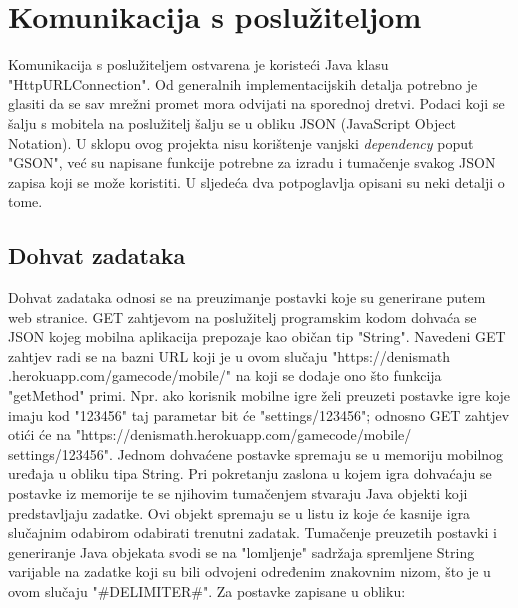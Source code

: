 \documentclass[times, utf8, zavrsni, numeric]{fer}
\begin{document}
	
	\section{Komunikacija s poslužiteljom}
	Komunikacija s poslužiteljem ostvarena je koristeći Java klasu "HttpURLConnection". Od generalnih implementacijskih detalja potrebno je glasiti da se sav mrežni promet mora odvijati na sporednoj dretvi. 
	Podaci koji se šalju s mobitela na poslužitelj šalju se u obliku JSON (JavaScript Object Notation). U sklopu ovog projekta nisu korištenje vanjski \textit{dependency} poput "GSON", već
	su napisane funkcije potrebne za izradu i tumačenje svakog JSON zapisa koji se može koristiti. U sljedeća dva potpoglavlja opisani su neki detalji o tome.
	\subsection{Dohvat zadataka}
	Dohvat zadataka odnosi se na preuzimanje postavki koje su generirane putem web stranice. GET zahtjevom na poslužitelj programskim kodom dohvaća se JSON kojeg mobilna aplikacija prepozaje kao običan tip "String".
	Navedeni GET zahtjev radi se na bazni URL koji je u ovom slučaju "https://denismath .herokuapp.com/gamecode/mobile/" na koji se dodaje ono što funkcija "getMethod" primi. Npr. ako korisnik mobilne igre želi preuzeti postavke
	igre koje imaju kod "123456"  taj parametar bit će "settings/123456"; odnosno GET zahtjev otići će na "https://denismath.herokuapp.com/gamecode/mobile/ settings/123456".
	Jednom dohvaćene postavke spremaju se u memoriju mobilnog uređaja u obliku tipa String. Pri pokretanju zaslona u kojem igra dohvaćaju se postavke iz memorije te se njihovim tumačenjem stvaraju Java objekti koji predstavljaju zadatke.
	Ovi objekt spremaju se u listu iz koje će kasnije igra slučajnim odabirom odabirati trenutni zadatak. Tumačenje preuzetih postavki i generiranje Java objekata svodi se na "lomljenje" sadržaja spremljene String varijable
	na zadatke koji su bili odvojeni određenim znakovnim nizom, što je u ovom slučaju "\#DELIMITER\#".
	Za postavke zapisane u obliku:
	
\end{document}
